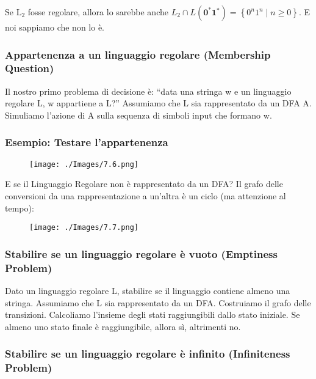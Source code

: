 Se $\mathrm{L}_{2}$ fosse regolare, allora lo sarebbe anche $L_{2} \cap L\left(\mathbf{0}^{*} \mathbf{1}^{*}\right)=\left\{0^{n} 1^{n} \mid n \geq 0\right\}$. E noi sappiamo che non lo è.

\subsubsection{Appartenenza a un linguaggio
regolare (Membership Question)}

Il nostro primo problema di decisione è:
“data una stringa w e un linguaggio
regolare L, w appartiene a L?” Assumiamo che L sia rappresentato da un
DFA A. Simuliamo l’azione di A sulla sequenza di
simboli input che formano w.

\subsubsection{Esempio: Testare l’appartenenza}

\begin{figure}[hbpt!]
    \centering
    \texttt{[image: ./Images/7.6.png]}
\end{figure}
\FloatBarrier

E se il Linguaggio Regolare non è
rappresentato da un DFA? Il grafo delle conversioni da una
rappresentazione a un’altra è un ciclo
(ma attenzione al tempo):

\begin{figure}[hbpt!]
    \centering
    \texttt{[image: ./Images/7.7.png]}
\end{figure}
\FloatBarrier

\subsubsection{Stabilire se un linguaggio regolare
è vuoto (Emptiness Problem)}

Dato un linguaggio regolare L, stabilire se il
linguaggio contiene almeno una stringa.
Assumiamo che L sia rappresentato da un
DFA.
Costruiamo il grafo delle transizioni.
Calcoliamo l’insieme degli stati raggiungibili
dallo stato iniziale.
Se almeno uno stato finale è raggiungibile,
allora sì, altrimenti no.

\subsubsection{Stabilire se un linguaggio regolare
è infinito (Infiniteness Problem)}


